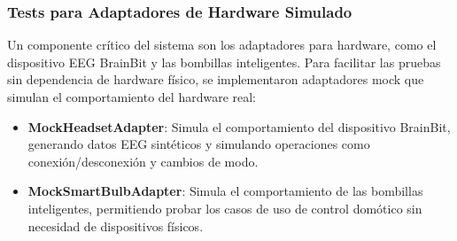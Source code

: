 \begin{table}[ht]
    \centering
    \small
    \caption{Resultados de pruebas unitarias del módulo Core}
    \label{tab:unit_tests_core}
\end{table}

\subsubsection{Tests para Adaptadores de Hardware Simulado}

Un componente crítico del sistema son los adaptadores para hardware, como el dispositivo EEG BrainBit y las bombillas inteligentes. Para facilitar las pruebas sin dependencia de hardware físico, se implementaron adaptadores mock que simulan el comportamiento del hardware real:

\begin{itemize}
    \item \textbf{MockHeadsetAdapter}: Simula el comportamiento del dispositivo BrainBit, generando datos EEG sintéticos y simulando operaciones como conexión/desconexión y cambios de modo.
    
    \item \textbf{MockSmartBulbAdapter}: Simula el comportamiento de las bombillas inteligentes, permitiendo probar los casos de uso de control domótico sin necesidad de dispositivos físicos.
\end{itemize}

